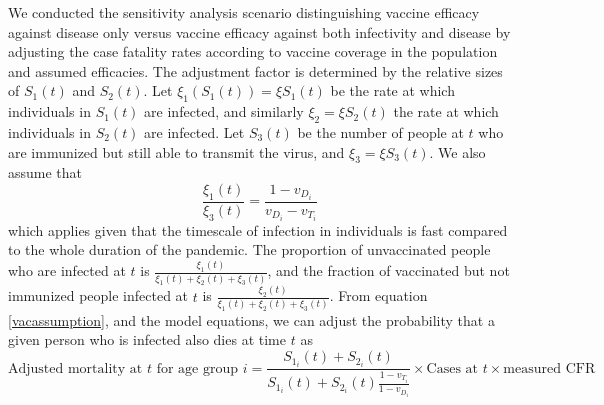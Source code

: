 \documentclass[10pt,onecolumn,twoside,lineno]{pnas-new}
\begin{document}
We conducted the sensitivity analysis scenario distinguishing vaccine efficacy against disease only versus vaccine efficacy against both infectivity and disease by adjusting the case fatality rates according to vaccine coverage in the population and assumed efficacies. The adjustment factor is determined by the relative sizes of $S_1(t)$ and $S_2(t)$. Let $\xi_1 (S_1(t)) = \xi S_1(t)$ be the rate at which individuals in $S_1(t)$ are infected, and similarly $\xi_2 = \xi S_2(t)$ the rate at which individuals in $S_2(t)$ are infected. Let $S_3(t)$ be the number of people at $t$ who are immunized but still able to transmit the virus, and $\xi_3 = \xi S_3(t)$. We also assume that
\begin{equation}
   \frac{\xi_1(t)}{\xi_3(t)} = \frac{1 - v_{D_i}}{v_{D_i} - v_{T_i}}
   \label{vacassumption}
\end{equation}
which applies given that the timescale of infection in individuals is fast compared to the whole duration of the pandemic. The proportion of unvaccinated people who are infected at $t$ is $\frac{\xi_1(t)}{\xi_1(t) + \xi_2(t) + \xi_3(t)}$, and the fraction of vaccinated but not immunized people infected at $t$ is $\frac{\xi_2(t)}{\xi_1(t) + \xi_2(t) + \xi_3(t)}$. From equation \ref{vacassumption}, and the model equations, we can adjust the probability that a given person who is infected also dies at time $t$ as
\begin{equation}
    \textrm{Adjusted mortality at } t  \textrm{ for age group } i = \frac{S_{1_i}(t) + S_{2_i}(t)}{S_{1_i}(t) + S_{2_i}(t)\frac{1 - v_{T_i}}{1 - v_{D_i}}} \times \textrm{Cases at }t \times \textrm{measured CFR}
\end{equation}

\clearpage 
\end{document}
